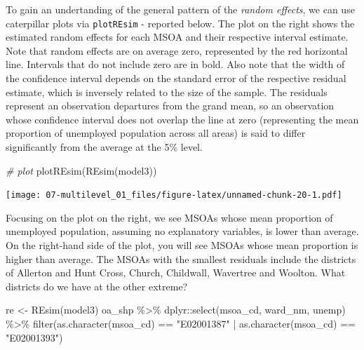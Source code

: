\documentclass[
]{book}
\newenvironment{Shaded}{\begin{snugshade}}{\end{snugshade}}
\newcommand{\CommentTok}[1]{\textcolor[rgb]{0.56,0.35,0.01}{\textit{#1}}}
\newcommand{\FunctionTok}[1]{\textcolor[rgb]{0.00,0.00,0.00}{#1}}
\newcommand{\NormalTok}[1]{#1}
\newcommand{\OtherTok}[1]{\textcolor[rgb]{0.56,0.35,0.01}{#1}}
\newcommand{\SpecialCharTok}[1]{\textcolor[rgb]{0.00,0.00,0.00}{#1}}
\newcommand{\StringTok}[1]{\textcolor[rgb]{0.31,0.60,0.02}{#1}}
\begin{document}
To gain an undertanding of the general pattern of the \emph{random effects}, we can use caterpillar plots via \texttt{plotREsim} - reported below. The plot on the right shows the estimated random effects for each MSOA and their respective interval estimate. Note that random effects are on average zero, represented by the red horizontal line. Intervals that do not include zero are in bold. Also note that the width of the confidence interval depends on the standard error of the respective residual estimate, which is inversely related to the size of the sample. The residuals represent an observation departures from the grand mean, so an observation whose confidence interval does not overlap the line at zero (representing the mean proportion of unemployed population across all areas) is said to differ significantly from the average at the 5\% level.

\begin{Shaded}
\begin{Highlighting}[]
\CommentTok{\# plot}
\FunctionTok{plotREsim}\NormalTok{(}\FunctionTok{REsim}\NormalTok{(model3)) }
\end{Highlighting}
\end{Shaded}

\texttt{[image: 07-multilevel\_01\_files/figure-latex/unnamed-chunk-20-1.pdf]}

Focusing on the plot on the right, we see MSOAs whose mean proportion of unemployed population, assuming no explanatory variables, is lower than average. On the right-hand side of the plot, you will see MSOAs whose mean proportion is higher than average. The MSOAs with the smallest residuals include the districts of Allerton and Hunt Cross, Church, Childwall, Wavertree and Woolton. What districts do we have at the other extreme?

\begin{Shaded}
\begin{Highlighting}[]
\NormalTok{re }\OtherTok{\textless{}{-}} \FunctionTok{REsim}\NormalTok{(model3)}
\NormalTok{oa\_shp }\SpecialCharTok{\%\textgreater{}\%}\NormalTok{ dplyr}\SpecialCharTok{::}\FunctionTok{select}\NormalTok{(msoa\_cd, ward\_nm, unemp) }\SpecialCharTok{\%\textgreater{}\%}
    \FunctionTok{filter}\NormalTok{(}\FunctionTok{as.character}\NormalTok{(msoa\_cd) }\SpecialCharTok{==} \StringTok{"E02001387"} \SpecialCharTok{|} \FunctionTok{as.character}\NormalTok{(msoa\_cd) }\SpecialCharTok{==} \StringTok{"E02001393"}\NormalTok{)}
\end{Highlighting}
\end{Shaded}
\end{document}
